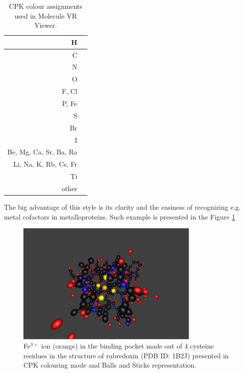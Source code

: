 \begin{table}[h]
\centering 
\begin{tabular}{|r|c|}
  \hline 
  H & \cellcolor[rgb]{1,1,1} \\
  \hline
  C & \cellcolor[rgb]{0,0,0} \\
  \hline
  N & \cellcolor[rgb]{0,0,1} \\
  \hline
  O & \cellcolor[rgb]{1,0,0} \\
  \hline
  F, Cl & \cellcolor[rgb]{0,1,0} \\
  \hline  
  P, Fe & \cellcolor[RGB]{255, 153, 0} \\
  \hline
  S & \cellcolor[rgb]{1, 0.92, 0.016} \\
  \hline
  Br & \cellcolor[RGB]{153, 0, 0} \\
  \hline
  I & \cellcolor[RGB]{148, 0, 211} \\
  \hline
  Be, Mg, Ca, Sr, Ba, Ra & \cellcolor[RGB]{0, 102, 0} \\
  \hline
  Li, Na, K, Rb, Cs, Fr & \cellcolor[RGB]{159, 0, 255} \\
  \hline
  Ti & \cellcolor[rgb]{0.5, 0.5, 0.5} \\
   \hline
  other & \cellcolor[RGB]{255, 0, 227} \\
  \hline
\end{tabular}

\caption{CPK colour assignments used in Molecule VR Viewer.}
\label{tab:cpk}
\end{table}

The big advantage of this style is its clarity and the easiness of recognizing e.g. metal cofactors in metalloproteins. Such example is presented in the Figure \ref{fig:cpk}


\begin{figure}[!htb]
\centering    
\includegraphics[width=0.8\textwidth]{Figs/cpk.png}
\caption{Fe$^{3+}$ ion (orange) in the binding pocket made out of 4 cysteine residues in the structure of rubredoxin (PDB ID: 1B2J) presented in CPK colouring mode and Balls and Sticks representation.}
\label{fig:cpk} 
\end{figure}

